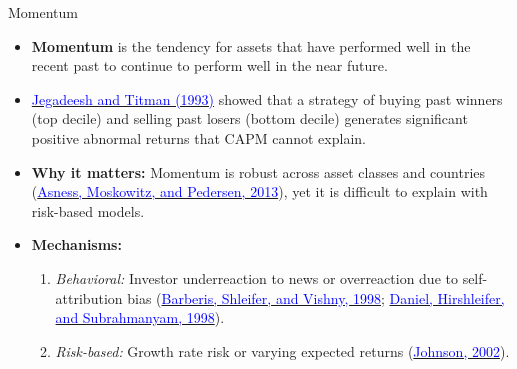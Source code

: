 \documentclass{beamer}
\begin{document}
\begin{frame}{Momentum}
	\begin{itemize}
		\item \textbf{Momentum} is the tendency for assets that have performed well in the recent past to continue to perform well in the near future.
		\item \href{https://onlinelibrary.wiley.com/doi/10.1111/j.1540-6261.1993.tb04702.x}{\textcolor{blue}{Jegadeesh and Titman (1993)}} showed that a strategy of buying past winners (top decile) and selling past losers (bottom decile) generates significant positive abnormal returns that CAPM cannot explain.
		\item \textbf{Why it matters:} Momentum is robust across asset classes and countries (\href{https://doi.org/10.1111/jofi.12021}{\textcolor{blue}{Asness, Moskowitz, and Pedersen, 2013}}), yet it is difficult to explain with risk-based models.
		\item \textbf{Mechanisms:}
		\begin{enumerate}
			\item \textit{Behavioral:} Investor underreaction to news or overreaction due to self-attribution bias (\href{https://doi.org/10.1016/S0304-405X(98)00027-0}{\textcolor{blue}{Barberis, Shleifer, and Vishny, 1998}}; \href{https://onlinelibrary.wiley.com/doi/full/10.1111/0022-1082.00077}{\textcolor{blue}{Daniel, Hirshleifer, and Subrahmanyam, 1998}}).
			\item \textit{Risk-based:} Growth rate risk or varying expected returns (\href{https://onlinelibrary.wiley.com/doi/abs/10.1111/1540-6261.00431}{\textcolor{blue}{Johnson, 2002}}).
		\end{enumerate}
	\end{itemize}
\end{frame}
\end{document}
